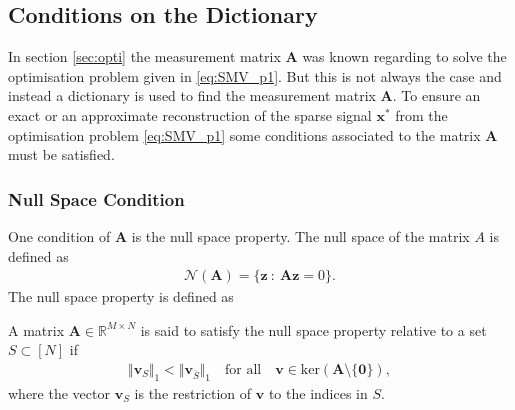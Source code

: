       
\subsection{Conditions on the Dictionary}
In section \ref{sec:opti} the measurement matrix $\mathbf{A}$ was known regarding to solve the optimisation problem given in \eqref{eq:SMV_p1}. But this is not always the case and instead a dictionary is used to find the measurement matrix $\mathbf{A}$. To ensure an exact or an approximate reconstruction of the sparse signal $\mathbf{x}^\ast$ from the optimisation problem \eqref{eq:SMV_p1} some conditions associated to the matrix $\mathbf{A}$ must be satisfied.

\subsubsection{Null Space Condition}
One condition of $\mathbf{A}$ is the null space property. The null space of the matrix $A$ is defined as
\begin{align*}
\mathcal{N}(\mathbf{A}) = \{ \mathbf{z} \ : \ \mathbf{Az} = 0 \}.
\end{align*} 
The null space property is defined as
\begin{definition}
A matrix $\mathbf{A} \in \mathbb{R}^{M \times N}$ is said to satisfy the null space property relative to a set $S \subset [N]$ if
\begin{align}
\Vert \textbf{v}_S \Vert_1 < \Vert \textbf{v}_{\overline{S}} \Vert_1 \quad \text{for all} \quad \textbf{v} \in \text{ker}(\mathbf{A} \setminus \lbrace \textbf{0} \rbrace),
\end{align}
where the vector $\mathbf{v}_S$ is the restriction of $\mathbf{v}$ to the indices in $S$. 
\end{definition}

